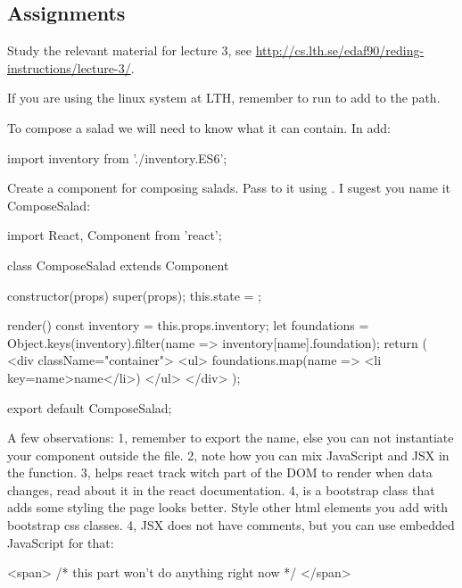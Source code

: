 \documentclass[fleqn, article, a4paper]{memoir}
\begin{document}
\subsection*{Assignments}

\begin{Assignments}

\item Study the relevant material for lecture 3, see \url{http://cs.lth.se/edaf90/reding-instructions/lecture-3/}. 

\item If you are using the linux system at LTH, remember to run  to add  to the path.

\item To compose a salad we will need to know what it can contain. In  add:
\begin{Code}
import inventory from './inventory.ES6';
\end{Code}

\item Create a component for composing salads. Pass  to it using . I sugest you name it ComposeSalad:
\begin{Code}
import React, { Component } from 'react';

class ComposeSalad extends Component {
  constructor(props) {
    super(props);
    this.state = {};
  }

  render() {
    const inventory = this.props.inventory;
    let foundations = Object.keys(inventory).filter(name => inventory[name].foundation);
    return (
      <div className="container">
        <ul>
          {foundations.map(name => <li key={name}>{name}</li>)}
        </ul>
      </div>
    );
  }
}

export default ComposeSalad;
\end{Code}

A few observations: 1, remember to export the name, else you can not instantiate your component outside the file. 2, note how you can mix JavaScript and JSX in the  function. 3,  helps react track witch part of the DOM to render when data changes, read about it in the react documentation. 4,  is a bootstrap class that adds some styling the page looks better. Style other html elements you add with bootstrap css classes. 4, JSX does not have comments, but you can use embedded JavaScript for that:
\begin{Code}
<span>
  {/* this part won't do anything right now */}
</span>
\end{Code}


\end{Assignments}
\end{document}
